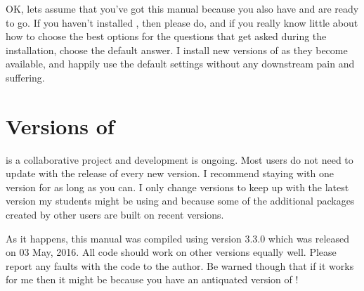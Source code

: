 OK, lets assume that you've got this manual because you also have \R{} and are ready to go. If you haven't installed \R{}, then please do, and if you really know little about how to choose the best options for the questions that get asked during the installation, choose the default answer. I install new versions of \R{} as they become available, and happily use the default settings without any downstream pain and suffering.

\section{Versions of \R{}}

\R{} is a collaborative project and development is ongoing. Most users do not need to update \R{} with the release of every new version. I recommend staying with one \R{} version for as long as you can. I only change versions to keep up with the latest version my students might be using and because some of the additional packages created by other \R{} users are built on recent versions. 

As it happens, this manual was compiled using version 3.3.0 which was released on 03 May, 2016. All code should work on other versions equally well. Please report any faults with the code to the author. Be warned though that if it works for me then it might be because you have an antiquated version of \R{}!



